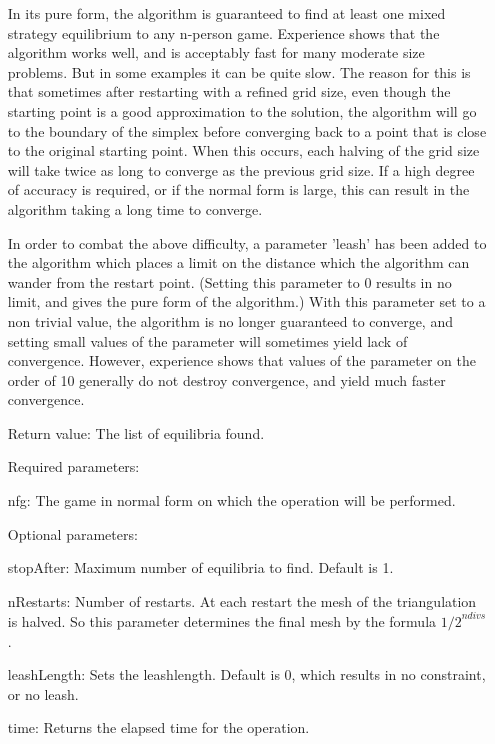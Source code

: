 \begin{itemize}
In its pure form, the algorithm is guaranteed to find at least one
mixed strategy equilibrium to any n-person game.  Experience shows
that the algorithm works well, and is acceptably fast for many
moderate size problems.  But in some examples it can be quite slow.
The reason for this is that sometimes after restarting with a refined
grid size, even though the starting point is a good approximation to
the solution, the algorithm will go to the boundary of the simplex
before converging back to a point that is close to the original
starting point.  When this occurs, each halving of the grid size will
take twice as long to converge as the previous grid size.  If a high
degree of accuracy is required, or if the normal form is large, this
can result in the algorithm taking a long time to converge.

In order to combat the above difficulty, a parameter 'leash' has been
added to the algorithm which places a limit on the distance which the
algorithm can wander from the restart point. (Setting this parameter
to 0 results in no limit, and gives the pure form of the algorithm.)
With this parameter set to a non trivial value, the algorithm is no
longer guaranteed to converge, and setting small values of the
parameter will sometimes yield lack of convergence.  However,
experience shows that values of the parameter on the order of 10
generally do not destroy convergence, and yield much faster
convergence.

\item
[Return value:] The list of equilibria found.
\item
[Required parameters:]\hfil\null

\bd
\item
[nfg:] The game in normal form on which the operation will be
performed.
\ed

\item
[Optional parameters:]\hfil\null
	
\bd
\item
[stopAfter:] Maximum number of equilibria to find. Default is 1.  
\item 
[nRestarts:] Number of restarts.  At each restart the mesh of the
triangulation is halved.  So this parameter determines the final mesh
by the formula ${1/2}^{ndivs}$.
\item
[leashLength:] Sets the leashlength. Default is 0, which results in no
constraint, or no leash.  
\item
[time:] Returns the elapsed time for the operation.
\ed
\ed


\end{itemize}
